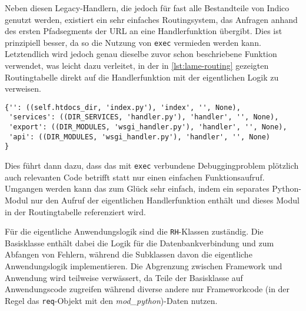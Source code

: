 Neben diesen Legacy-Handlern, die jedoch für fast alle Bestandteile von Indico genutzt werden,
existiert ein sehr einfaches Routingsystem, das Anfragen anhand des ersten Pfadsegments der URL an
eine Handlerfunktion übergibt. Dies ist prinzipiell besser, da so die Nutzung von \lstinline{exec}
vermieden werden kann. Letztendlich wird jedoch genau dieselbe zuvor schon
beschriebene Funktion verwendet, was leicht dazu verleitet, in der in \autoref{lst:lame-routing}
gezeigten Routingtabelle direkt auf die Handlerfunktion mit der eigentlichen Logik zu verweisen.

\begin{lstlisting}[caption=Einfaches URL-Routing,label=lst:lame-routing]
{'': ((self.htdocs_dir, 'index.py'), 'index', '', None),
 'services': ((DIR_SERVICES, 'handler.py'), 'handler', '', None),
 'export': ((DIR_MODULES, 'wsgi_handler.py'), 'handler', '', None),
 'api': ((DIR_MODULES, 'wsgi_handler.py'), 'handler', '', None)
}
\end{lstlisting}

Dies führt dann dazu, dass das mit \lstinline{exec} verbundene Debuggingproblem plötzlich
auch relevanten Code betrifft statt nur einen einfachen Funktionsaufruf. Umgangen werden kann das
zum Glück sehr einfach, indem ein separates Python-Modul nur den Aufruf der eigentlichen
Handlerfunktion enthält und dieses Modul in der Routingtabelle referenziert wird.

Für die eigentliche Anwendungslogik sind die \lstinline{RH}-Klassen zuständig. Die Basisklasse
enthält dabei die Logik für die Datenbankverbindung und zum Abfangen von Fehlern, während die
Subklassen davon die eigentliche Anwendungslogik implementieren. Die Abgrenzung zwischen Framework
und Anwendung wird teilweise verwässert, da Teile der Basisklasse auf Anwendungscode zugreifen
während diverse andere nur Frameworkcode (in der Regel das \lstinline{req}-Objekt mit den
\emph{mod\_python})-Daten nutzen.

